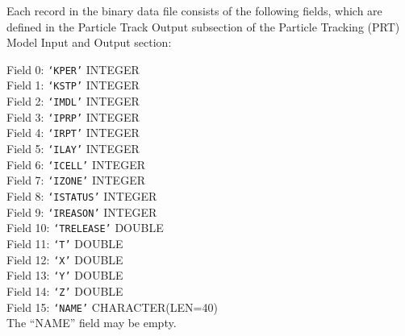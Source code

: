 Each record in the binary data file consists of the following fields, which are defined in the
Particle Track Output subsection of the Particle Tracking (PRT) Model Input and Output section:

\vspace{5mm}
\noindent Field 0: \texttt{`KPER'} {\color{red} \footnotesize{INTEGER}} \\
\noindent Field 1: \texttt{`KSTP'} {\color{red} \footnotesize{INTEGER}} \\
\noindent Field 2: \texttt{`IMDL'} {\color{red} \footnotesize{INTEGER}} \\
\noindent Field 3: \texttt{`IPRP'} {\color{red} \footnotesize{INTEGER}} \\
\noindent Field 4: \texttt{`IRPT'} {\color{red} \footnotesize{INTEGER}} \\
\noindent Field 5: \texttt{`ILAY'} {\color{red} \footnotesize{INTEGER}} \\
\noindent Field 6: \texttt{`ICELL'} {\color{red} \footnotesize{INTEGER}} \\
\noindent Field 7: \texttt{`IZONE'} {\color{red} \footnotesize{INTEGER}} \\
\noindent Field 8: \texttt{`ISTATUS'} {\color{red} \footnotesize{INTEGER}} \\
\noindent Field 9: \texttt{`IREASON'} {\color{red} \footnotesize{INTEGER}} \\
\noindent Field 10: \texttt{`TRELEASE'} {\color{red} \footnotesize{DOUBLE}} \\
\noindent Field 11: \texttt{`T'} {\color{red} \footnotesize{DOUBLE}} \\
\noindent Field 12: \texttt{`X'} {\color{red} \footnotesize{DOUBLE}} \\
\noindent Field 13: \texttt{`Y'} {\color{red} \footnotesize{DOUBLE}} \\
\noindent Field 14: \texttt{`Z'} {\color{red} \footnotesize{DOUBLE}} \\
\noindent Field 15: \texttt{`NAME'} {\color{red} \footnotesize{CHARACTER(LEN=40)}} \\

\vspace{4mm}
\noindent The ``NAME'' field may be empty.
